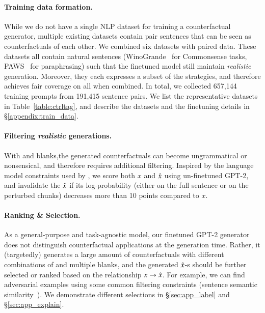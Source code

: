 
\paragraph{Training data formation.}
While we do not have a single NLP dataset for training a counterfactual generator, multiple existing datasets contain pair sentences that can be seen as counterfactuals of each other. 
We combined six datasets with paired data.
These datasets all contain natural sentences (\eg WinoGrande~\cite{sakaguchi2019winogrande} for Commonsense tasks, PAWS~\cite{zhang2019paws} for paraphrasing) such that the finetuned model still maintain \emph{realistic} generation.
Moreover, they each expresses a subset of the strategies, and therefore achieves fair coverage on all \tagstrs when combined.
In total, we collected 657,144 training prompts from 191,415 sentence pairs.
We list the representative datasets in Table~\ref{table:ctrltag}, and describe the datasets and the finetuning details in \S\ref{appendix:train_data}.


\paragraph{Filtering \emph{realistic} generations.}
With \tagstrs and blanks,the generated counterfactuals can become ungrammatical or nonsensical, and therefore requires additional filtering.
Inspired by the language model constraints used by \citet{morris2020textattack}, we score both $x$ and $\hat{x}$ using un-finetuned GPT-2, and invalidate the $\hat{x}$ if its log-probability (either on the full sentence or on the perturbed chunks) decreases more than 10 points compared to $x$.


\paragraph{Ranking \& Selection.}
As a general-purpose and task-agnostic model, our finetuned GPT-2 generator does not distinguish counterfactual applications at the generation time.
Rather, it (targetedly) generates a large amount of counterfactuals with different combinations of \tagstrs and multiple blanks, and the generated $\hat{x}$-s should be further selected or ranked based on the relationship $x \rightarrow \hat{x}$.
For example, we can find adversarial examples using some common filtering constraints (\eg sentence semantic similarity~\cite{morris2020textattack}).
We demonstrate different selections in \S\ref{sec:app_label} and \S\ref{sec:app_explain}.



